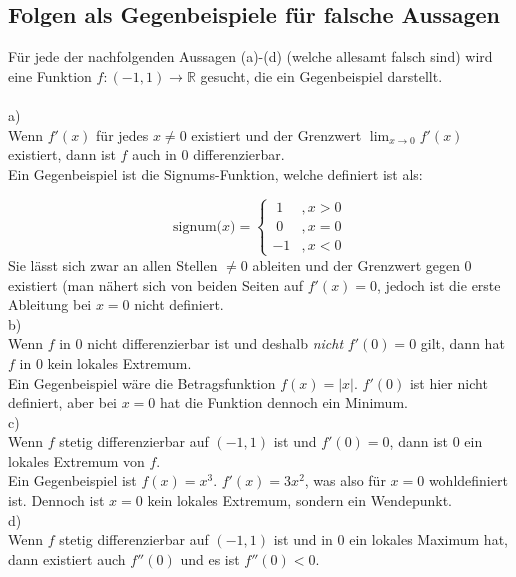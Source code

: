 \documentclass[10pt,a4paper^, twocolumn]{article}
\begin{document}
\subsection{Folgen als Gegenbeispiele für falsche Aussagen}
Für jede der nachfolgenden Aussagen (a)-(d) (welche allesamt falsch sind) wird eine Funktion $f:(-1,1) \to \mathbb{R}$ gesucht, die ein Gegenbeispiel darstellt. \\\\
a)\\
Wenn $f'(x)$ für jedes $x \neq 0$ existiert und der Grenzwert $\lim_{x \to 0} f'(x)$ existiert, dann ist $f$ auch in $0$ differenzierbar. \\

Ein Gegenbeispiel ist die Signums-Funktion, welche definiert ist als:

$$ \text{signum(}x) = \begin{cases} \; 1 & ,x > 0 \\ \; 0 & ,x = 0 \\ -1 & ,x < 0 \end{cases} $$Sie lässt sich zwar an allen Stellen $ \neq 0$ ableiten und der Grenzwert gegen 0 existiert (man nähert sich von beiden Seiten auf $f'(x) = 0$, jedoch ist die erste Ableitung bei $x=0$ nicht definiert.
\\


b)\\
Wenn $f$ in $0$ nicht differenzierbar ist und deshalb \emph{nicht} $f'(0) = 0$ gilt, dann hat $f$ in $0$ kein lokales Extremum. \\

Ein Gegenbeispiel wäre die Betragsfunktion $f(x) = |x|$. $f'(0)$ ist hier nicht definiert, aber bei $x=0$ hat die Funktion dennoch ein Minimum.\\


c)\\
Wenn $f$ stetig differenzierbar auf $(-1,1)$ ist und $f'(0) = 0$, dann ist $0$ ein lokales Extremum von $f$. \\

Ein Gegenbeispiel ist $f(x) = x^3$. $f'(x) = 3x^2$, was also für $x=0$ wohldefiniert ist. Dennoch ist $x=0$ kein lokales Extremum, sondern ein Wendepunkt.\\


d)\\
Wenn $f$ stetig differenzierbar auf $(-1,1)$ ist und in $0$ ein lokales Maximum hat, dann existiert auch $f''(0)$ und es ist $f''(0) < 0$.\\
\end{document}
